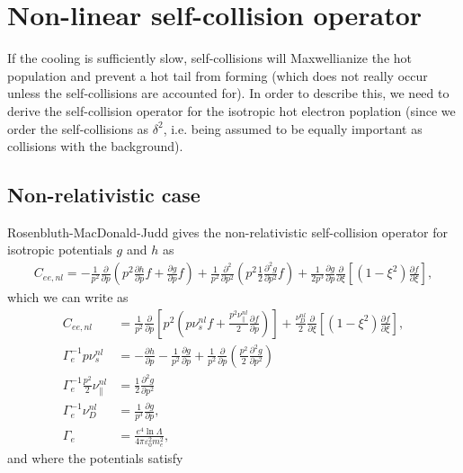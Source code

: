 \documentclass[11pt,a4paper]{article}
\begin{document}
\section{Non-linear self-collision operator}
If the cooling is sufficiently slow, self-collisions will Maxwellianize the hot population and prevent a hot tail from forming (which does not really occur unless the self-collisions are accounted for). In order to describe this, we need to derive the self-collision operator for the isotropic hot electron poplation (since we order the self-collisions as $\delta^2$, i.e. being assumed to be equally important as collisions with the background). 

\subsection{Non-relativistic case}
Rosenbluth-MacDonald-Judd gives the non-relativistic self-collision operator for isotropic potentials $g$ and $h$ as
\begin{align}
C_{ee,nl} =  -\frac{1}{p^2}\frac{\partial}{\partial p}\left(p^2\frac{\partial h}{\partial p}f+\frac{\partial g}{\partial p}f\right) + \frac{1}{p^2}\frac{\partial^2}{\partial p^2} \left(p^2\frac{1}{2}\frac{\partial^2 g}{\partial p^2} f\right) +\frac{1}{2p^3}\frac{\partial g}{\partial p}\frac{\partial}{\partial \xi}\left[(1-\xi^2)\frac{\partial f}{\partial \xi}\right],
\end{align}
which we can write as
\begin{align}
C_{ee,nl} &= \frac{1}{p^2}\frac{\partial}{\partial p}\left[p^2\left( p\nu_s^{nl} f+ \frac{p^2\nu_\parallel^{nl}}{2}\frac{\partial f}{\partial p}\right)\right] + \frac{\nu_D^{nl}}{2}\frac{\partial}{\partial \xi}\left[(1-\xi^2)\frac{\partial f}{\partial\xi}\right], \\
\Gamma_e^{-1}p\nu_s^{nl} &= -\frac{\partial h}{\partial p} - \frac{1}{p^2}\frac{\partial g}{\partial p} +\frac{1}{p^2}\frac{\partial}{\partial p}\left(\frac{p^2}{2}\frac{\partial^2 g}{\partial p^2}\right) \nonumber \\
\Gamma_e^{-1}\frac{p^2}{2}\nu_\parallel^{nl} &= \frac{1}{2}\frac{\partial^2 g}{\partial p^2} \nonumber\\
\Gamma_e^{-1}\nu_D^{nl} &= \frac{1}{p^3}\frac{\partial g}{\partial p}  \nonumber, \\
\Gamma_e &= \frac{e^4 \ln\Lambda}{4\pi\varepsilon_0^2 m_e^2}, \nonumber
\end{align}
and where the potentials satisfy
\end{document}
